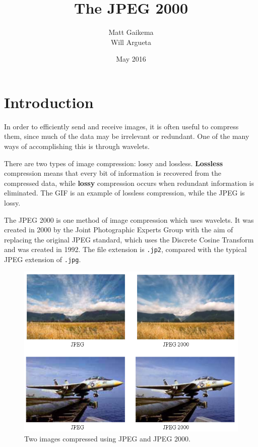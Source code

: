 \documentclass[titlepage,12pt]{article}
\title{The JPEG 2000}
\author{Matt Gaikema \\ Will Argueta}
\date{May 2016}
\begin{document}
\maketitle

\section{Introduction}

In order to efficiently send and receive images, it is often useful to compress them, 
since much of the data may be irrelevant or redundant.
One of the many ways of accomplishing this is through wavelets.

There are two types of image compression: lossy and lossless.
\textbf{Lossless} compression means that every bit of information is recovered from the compressed data,
while \textbf{lossy} compression occurs when redundant information is eliminated.
The GIF is an example of lossless compression, while the JPEG is lossy.

The JPEG 2000 is one method of image compression which uses wavelets.
It was created in 2000 by the Joint Photographic Experts Group with the aim of replacing the original JPEG standard, 
which uses the Discrete Cosine Transform and was created in 1992.
The file extension is \verb|.jp2|, compared with the typical JPEG extension of \verb|.jpg|.

\begin{figure}[h]
	\centering
	\includegraphics[scale=0.4]{resources/comparison.png}
	\caption{Two images compressed using JPEG and JPEG 2000.\cite{comparison}}
	\label{fig:compare}
\end{figure}
\end{document}
